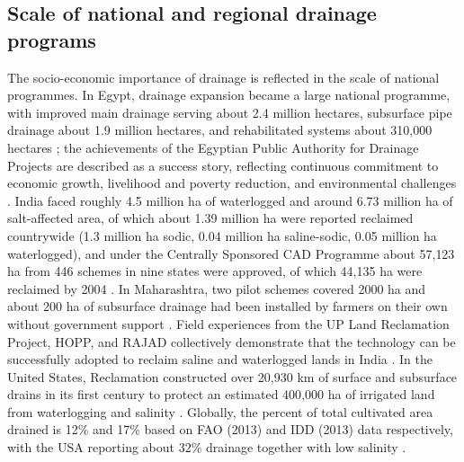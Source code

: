 \subsection{Scale of national and regional drainage programs}
The socio-economic importance of drainage is reflected in the scale of national programmes. In Egypt, drainage expansion became a large national programme, with improved main drainage serving about 2.4 million hectares, subsurface pipe drainage about 1.9 million hectares, and rehabilitated systems about 310{,}000 hectares \parencite{AbdelDayem2007}; the achievements of the Egyptian Public Authority for Drainage Projects are described as a success story, reflecting continuous commitment to economic growth, livelihood and poverty reduction, and environmental challenges \parencite{AbdelDayem2007}. India faced roughly 4.5 million ha of waterlogged and around 6.73 million ha of salt-affected area, of which about 1.39 million ha were reported reclaimed countrywide (1.3 million ha sodic, 0.04 million ha saline-sodic, 0.05 million ha waterlogged), and under the Centrally Sponsored CAD Programme about 57{,}123 ha from 446 schemes in nine states were approved, of which 44{,}135 ha were reclaimed by 2004 \parencite{Gopalakrishnan2007}. In Maharashtra, two pilot schemes covered 2000 ha and about 200 ha of subsurface drainage had been installed by farmers on their own without government support \parencite{Gopalakrishnan2007}. Field experiences from the UP Land Reclamation Project, HOPP, and RAJAD collectively demonstrate that the technology can be successfully adopted to reclaim saline and waterlogged lands in India \parencite{Gopalakrishnan2007}. In the United States, Reclamation constructed over 20{,}930 km of surface and subsurface drains in its first century to protect an estimated 400{,}000 ha of irrigated land from waterlogging and salinity \parencite{TeKrony2004}. Globally, the percent of total cultivated area drained is 12\% and 17\% based on FAO (2013) and IDD (2013) data respectively, with the USA reporting about 32\% drainage together with low salinity \parencite{Valipour2014}.

